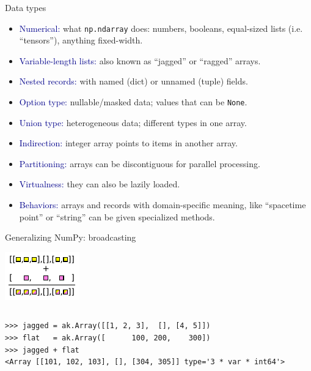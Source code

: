 \documentclass[aspectratio=169]{beamer}
\begin{document}
\begin{frame}{Data types }
\Large
\vspace{0.2 cm}

\begin{itemize}
\item<1-> \textcolor{darkblue}{Numerical:} what \texttt{np.ndarray} does: numbers, booleans, equal-sized lists (i.e. ``tensors''), anything fixed-width.
\item<2-> \textcolor{darkblue}{Variable-length lists:} also known as ``jagged'' or ``ragged'' arrays.
\item<3-> \textcolor{darkblue}{Nested records:} with named (dict) or unnamed (tuple) fields.
\item<4-> \textcolor{darkblue}{Option type:} nullable/masked data; values that can be \texttt{None}.
\item<5-> \textcolor{darkblue}{Union type:} heterogeneous data; different types in one array.
\end{itemize}

\vspace{0.25 cm}
\begin{itemize}
\item<6-> \textcolor{darkblue}{Indirection:} integer array points to items in another array.
\item<7-> \textcolor{darkblue}{Partitioning:} arrays can be discontiguous for parallel processing.
\item<8-> \textcolor{darkblue}{Virtualness:} they can also be lazily loaded.
\item<9-> \textcolor{darkblue}{Behaviors:} arrays and records with domain-specific meaning, like ``spacetime point'' or ``string'' can be given specialized methods.
\end{itemize}
\end{frame}

\begin{frame}[fragile]{Generalizing NumPy: broadcasting}
\begin{center}
\includegraphics[width=0.4\linewidth]{img/cartoon-broadcasting.pdf}
\end{center}

\begin{columns}
\begin{verbatim}
>>> jagged = ak.Array([[1, 2, 3],  [], [4, 5]])
>>> flat   = ak.Array([      100, 200,    300])
>>> jagged + flat
<Array [[101, 102, 103], [], [304, 305]] type='3 * var * int64'>
\end{verbatim}
\end{columns}
\end{frame}
\end{document}
